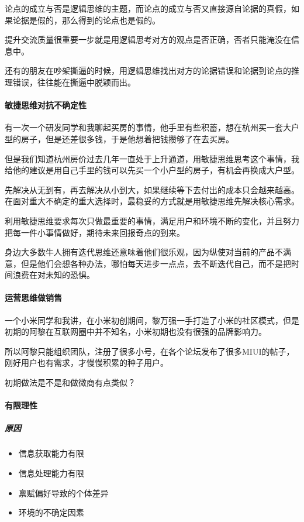 \documentclass[letterpaper,11pt,english]{sphinxmanual}
\begin{document}
论点的成立与否是逻辑思维的主题，而论点的成立与否又直接源自论据的真假，如果论据是假的，那么得到的论点也是假的。

提升交流质量很重要一步就是用逻辑思考对方的观点是否正确，否者只能淹没在信息中。

还有的朋友在吵架撕逼的时候，用逻辑思维找出对方的论据错误和论据到论点的推理错误，往往能在撕逼中脱颖而出。


\paragraph{敏捷思维对抗不确定性}
\label{\detokenize{chapter_idea/idea:id4}}
有一次一个研发同学和我聊起买房的事情，他手里有些积蓄，想在杭州买一套大户型的房子，但是还差很多钱，于是他想着把钱攒够了在去买房。

但是我们知道杭州房价过去几年一直处于上升通道，用敏捷思维思考这个事情，我给他的建议是用自己手里的钱可以先买一个小户型的房子，有机会再换成大户型。

先解决从无到有，再去解决从小到大，如果继续等下去付出的成本只会越来越高。在面对重大不确定的重大选择时，最稳妥的方式就是用敏捷思维先解决核心需求。

利用敏捷思维要求每次只做最重要的事情，满足用户和环境不断的变化，并且努力把每一件小事情做好，期待未来回报奇点的到来。

身边大多数牛人拥有迭代思维还意味着他们很乐观，因为纵使对当前的产品不满意，但是他们会想各种办法，哪怕每天进步一点点，去不断迭代自己，而不是把时间浪费在对未知的恐惧。


\paragraph{运营思维做销售}
\label{\detokenize{chapter_idea/idea:id5}}
一个小米同学和我讲，在小米初创期间，黎万强一手打造了小米的社区模式，但是初期的阿黎在互联网圈中并不知名，小米初期也没有很强的品牌影响力。

所以阿黎只能组织团队，注册了很多小号，在各个论坛发布了很多MIUI的帖子，刚好用户也有需求，才慢慢积累的种子用户。

初期做法是不是和做微商有点类似？


\paragraph{有限理性}
\label{\detokenize{chapter_idea/idea:id6}}

\subparagraph{原因}
\label{\detokenize{chapter_idea/idea:id7}}\begin{itemize}
\item {} 
信息获取能力有限

\item {} 
信息处理能力有限

\item {} 
禀赋偏好导致的个体差异

\item {} 
环境的不确定因素

\end{itemize}
\end{document}
